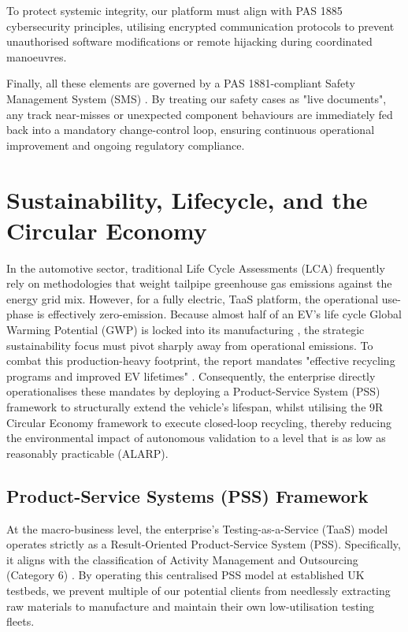 To protect systemic integrity, our platform must align with PAS 1885 \cite{pas1885} cybersecurity principles, utilising encrypted communication protocols to prevent unauthorised software modifications or remote hijacking during coordinated manoeuvres.

Finally, all these elements are governed by a PAS 1881-compliant Safety Management System (SMS) \cite{pas1881}. By treating our safety cases as "live documents", any track near-misses or unexpected component behaviours are immediately fed back into a mandatory change-control loop, ensuring continuous operational improvement and ongoing regulatory compliance.

\section{Sustainability, Lifecycle, and the Circular Economy}

In the automotive sector, traditional Life Cycle Assessments (LCA) frequently rely on methodologies that weight tailpipe greenhouse gas emissions against the energy grid mix. However, for a fully electric, TaaS platform, the operational use-phase is effectively zero-emission. Because almost half of an EV's life cycle Global Warming Potential (GWP) is locked into its manufacturing \cite[p.~56]{hawkins_2013}, the strategic sustainability focus must pivot sharply away from operational emissions. To combat this production-heavy footprint, the report mandates "effective recycling programs and improved EV lifetimes" \cite[p.~61]{hawkins_2013}. Consequently, the enterprise directly operationalises these mandates by deploying a Product-Service System (PSS) framework to structurally extend the vehicle's lifespan, whilst utilising the 9R Circular Economy framework to execute closed-loop recycling, thereby reducing the environmental impact of autonomous validation to a level that is as low as reasonably practicable (ALARP).

\subsection{Product-Service Systems (PSS) Framework}

At the macro-business level, the enterprise's Testing-as-a-Service (TaaS) model operates strictly as a Result-Oriented Product-Service System (PSS). Specifically, it aligns with the classification of Activity Management and Outsourcing (Category 6) \cite[p.~254]{tukker}. By operating this centralised PSS model at established UK testbeds, we prevent multiple of our potential clients from needlessly extracting raw materials to manufacture and maintain their own low-utilisation testing fleets.

